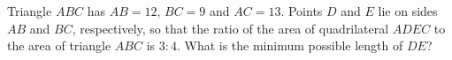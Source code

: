Triangle $ABC$ has $AB=12$, $BC=9$ and $AC=13$. Points $D$ and $E$ lie on sides $AB$ and $BC$, respectively, so that the ratio of the area of quadrilateral $ADEC$ to the area of triangle $ABC$ is $3:4$. What is the minimum possible length of $DE$?
